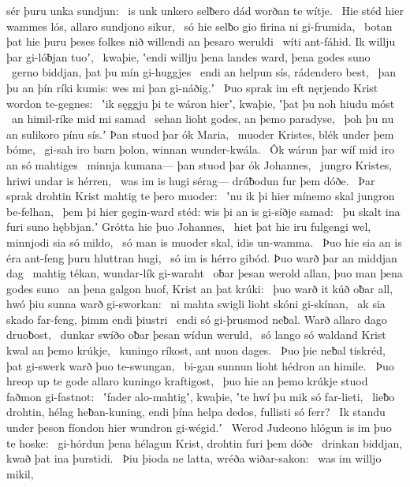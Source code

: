 sér þuru unka sundjun: \hld\ is unk unkero selƀero dád
worðan te wítje. \hld\ Hie stéd hier wammes lós,
allaro sundjono sikur, \hld\ só hie selƀo gio
firina ni gi-frumida, \hld\ botan þat hie þuru þeses folkes nið
willendi an þesaro weruldi \hld\ wíti ant-fáhid.
Ik willju þar gi-lóƀjan tuoʼ, \hld\ kwaþie, ʽendi willju þena landes ward,
þena godes suno \hld\ gerno biddjan,
þat þu mín gi-huggjes \hld\ endi an helpun sís,
rádendero best, \hld\ þan þu an þín ríki kumis:
wes mi þan gi-náðig.ʼ \hld\ Þuo sprak im eft nęrjendo Krist
wordon te-gegnes: \hld\ ʽik sęggju þi te wáron hierʼ, kwaþie,
ʽþat þu noh hiudu móst \hld\ an himil-ríke
mid mi samad \hld\ sehan lioht godes,
an þemo paradyse, \hld\ þoh þu nu an sulikoro pínu sís.ʼ
Þan stuod þar ók Maria, \hld\ muoder Kristes,
blék under þem bóme, \hld\ gi-sah iro barn þolon,
winnan wunder-kwála. \hld\ Ôk wárun þar wíf mid iro
an só mahtiges \hld\ minnja kumana—
þan stuod þar ók Johannes, \hld\ jungro Kristes,
hriwi undar is hérren, \hld\ was im is hugi sérag—
drúƀodun fur þem dóðe. \hld\ Þar sprak drohtin Krist
mahtig te þero muoder: \hld\ ʽnu ik þi hier mínemo skal
jungron be-felhan, \hld\ þem þi hier gegin-ward stéd:
wis þi an is gi-síðje samad: \hld\ þu skalt ina furi suno hębbjan.ʼ
Grótta hie þuo Johannes, \hld\ hiet þat hie iru fulgengi wel,
minnjodi sia só mildo, \hld\ só man is muoder skal,
idis un-wamma. \hld\ Þuo hie sia an is éra ant-feng
þuru hluttran hugi, \hld\ só im is hérro gibód.
Þuo warð þar an middjan dag \hld\ mahtig tékan,
wundar-lík gi-waraht \hld\ oƀar þesan werold allan,
þuo man þena godes suno \hld\ an þena galgon huof,
Krist an þat krúki: \hld\ þuo warð it kúð oƀar all,
hwó þiu sunna warð gi-sworkan: \hld\ ni mahta swigli lioht
skóni gi-skínan, \hld\ ak sia skado far-feng,
þimm endi þiustri \hld\ endi só gi-þrusmod neƀal.
Warð allaro dago druoƀost, \hld\ dunkar swíðo
oƀar þesan wídun weruld, \hld\ só lango só waldand Krist
kwal an þemo krúkje, \hld\ kuningo ríkost,
ant nuon dages. \hld\ Þuo þie neƀal tiskréd,
þat gi-swerk warð þuo te-swungan, \hld\ bi-gan sunnun lioht
hédron an himile. \hld\ Þuo hreop up te gode
allaro kuningo kraftigost, \hld\ þuo hie an þemo krúkje stuod
faðmon gi-fastnot: \hld\ ʽfader alo-mahtigʼ, kwaþie,
ʽte hwí þu mik só far-lieti, \hld\ lieƀo drohtin,
hélag heƀan-kuning, endi þína helpa dedos,
fullisti só ferr? \hld\ Ik standu under þeson fíondon hier
wundron gi-wégid.ʼ \hld\ Werod Judeono
hlógun is im þuo te hoske: \hld\ gi-hórdun þena hélagun Krist,
drohtin furi þem dóðe \hld\ drinkan biddjan,
kwað þat ina þurstidi. \hld\ Þiu þioda ne latta,
wréða wiðar-sakon: \hld\ was im willjo mikil,
